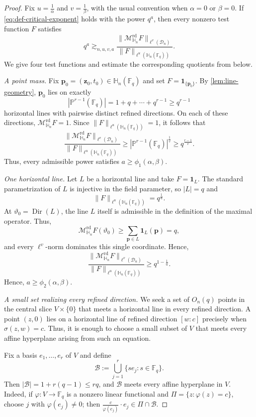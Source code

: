 \documentclass[10pt,a4paper]{amsart}
\newcommand{\Dir}{\operatorname{Dir}}
\newcommand{\Dn}{\mathcal D_n}
\newcommand{\Fq}{\mathbb F_q}
\newcommand{\HH}{\mathbb H}
\newcommand{\Mrd}{\mathcal M^{\mathrm{rd}}_{\HH_n}}
\newcommand{\PP}{\mathbb P}
\newcommand{\norm}[1]{\lVert #1\rVert}
\newcommand{\one}{\mathbf 1}
\begin{document}
\begin{proof}
Fix $u=\frac{1}{\alpha}$ and $v=\frac{1}{\beta}$, with the usual convention when $\alpha=0$ or $\beta=0$. If \eqref{eq:def-critical-exponent} holds with the power $q^a$, then every nonzero test function $F$ satisfies
\begin{equation}\label{eq:test-function-principle}
 q^a
 \gtrsim_{n,u,v,a}
 \frac{\norm{\Mrd F}_{\ell^v(\Dn)}}
      {\norm{F}_{\ell^u(\HH_n(\Fq))}}.
\end{equation}
We give four test functions and estimate the corresponding quotients from below.

\emph{A point mass.}
Fix $\mathbf{p}_0=(\mathbf{z}_0,t_0)\in\HH_n(\Fq)$ and set
$F=\one_{\{\mathbf{p}_0\}}$.  By \cref{lem:line-geometry},
$\mathbf{p}_0$ lies on exactly
\[
 |\PP^{r-1}(\Fq)|=1+q+\cdots+q^{r-1} \geq q^{r-1}
\]
horizontal lines with pairwise distinct refined directions. On each of these directions, $\Mrd F=1$. Since $\norm{F}_{\ell^u(\HH_n(\Fq))}=1$, it follows that
\[
 \frac{\norm{\Mrd F}_{\ell^v(\Dn)}}
      {\norm{F}_{\ell^u(\HH_n(\Fq))}}
 \geq |\PP^{r-1}(\Fq)|^{\frac{1}{v}}
 \geq q^{\frac{r-1}{v}}.
\]
Thus, every admissible power satisfies $a\geq\phi_1(\alpha,\beta)$.

\emph{One horizontal line.}
Let $L$ be a horizontal line and take $F=\one_L$. The standard
parametrization of $L$ is injective in the field parameter, so $|L|=q$
and
\[
 \norm{F}_{\ell^u(\HH_n(\Fq))}=q^{\frac{1}{u}}.
\]
At $\vartheta_0=\Dir(L)$, the line $L$ itself is admissible in the
definition of the maximal operator. Thus,
\[
 \Mrd F(\vartheta_0)
 \geq\sum_{\mathbf{p}\in L}\one_L(\mathbf{p})
 =q,
\]
and every $\ell^v$-norm dominates this single coordinate. Hence,
\[
 \frac{\norm{\Mrd F}_{\ell^v(\Dn)}}
      {\norm{F}_{\ell^u(\HH_n(\Fq))}}
 \geq q^{1-\frac{1}{u}}.
\]
Hence, $a\geq\phi_2(\alpha,\beta)$.



\emph{A small set realizing every refined direction.}
We seek a set of $O_n(q)$ points in the central slice $V\times\{0\}$ that meets a horizontal line in every refined direction. A point $(z,0)$ lies on a horizontal line of refined direction $[w:c]$ precisely when $\sigma(z, w)=c$. Thus, it is enough to choose a small subset of $V$ that meets every affine hyperplane arising from such an equation.

Fix a basis $e_1,\ldots,e_r$ of $V$ and define
\begin{equation}\label{eq:axes-set}
 \mathcal B
 :=
 \bigcup_{j=1}^r
 \{s e_j:s\in\Fq\}.
\end{equation}
Then $|\mathcal B|=1+r(q-1) \leq r q$, and $\mathcal B$ meets every affine hyperplane in $V$. Indeed, if $\varphi:V\to\Fq$ is a nonzero linear functional and $\Pi=\{z:\varphi(z)=c\}$, choose $j$ with
$\varphi(e_j)\neq 0$; then
$\frac{c}{\varphi(e_j)} \cdot e_j\in\Pi\cap\mathcal B$.


\end{proof}
\end{document}
